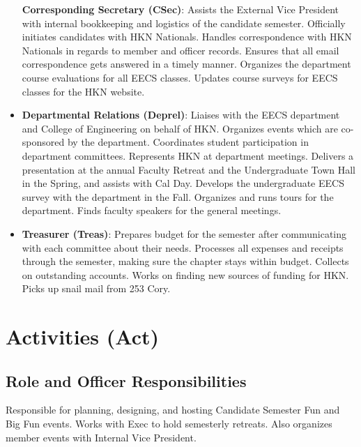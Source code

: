 \documentclass[11pt, article, oneside]{memoir}
\begin{document}
\begin{itemize}
                \textbf{Corresponding Secretary (CSec)}: Assists the External Vice President with internal bookkeeping and logistics of the candidate semester.
                Officially initiates candidates with HKN Nationals.
                Handles correspondence with HKN Nationals in regards to member and officer records.
                Ensures that all email correspondence gets answered in a timely manner.
                Organizes the department course evaluations for all EECS classes.
                Updates course surveys for EECS classes for the HKN website.
            \item
                \textbf{Departmental Relations (Deprel)}: Liaises with the EECS department and College of Engineering on behalf of HKN.
                Organizes events which are co-sponsored by the department.
                Coordinates student participation in department committees.
                Represents HKN at department meetings.
                Delivers a presentation at the annual Faculty Retreat and the Undergraduate Town Hall in the Spring, and assists with Cal Day.
                Develops the undergraduate EECS survey with the department in the Fall.
                Organizes and runs tours for the department.
                Finds faculty speakers for the general meetings.
            \item
                \textbf{Treasurer (Treas)}: Prepares budget for the semester after communicating with each committee about their needs.
                Processes all expenses and receipts through the semester, making sure the chapter stays within budget.
                Collects on outstanding accounts.
                Works on finding new sources of funding for HKN.
                Picks up snail mail from 253 Cory.
        \end{itemize}

    \section{Activities (Act)}
    \subsection{Role and Officer Responsibilities}
        Responsible for planning, designing, and hosting Candidate Semester Fun and Big Fun events.
        Works with Exec to hold semesterly retreats.
        Also organizes member events with Internal Vice President.
\end{document}
